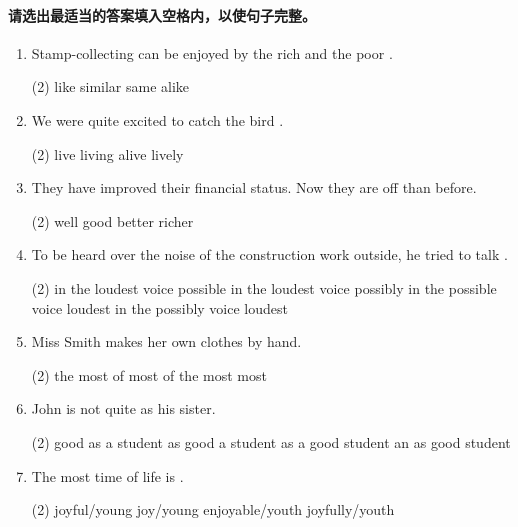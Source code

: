 \paragraph{请选出最适当的答案填入空格内，以使句子完整。}

\begin{enumerate}
\item Stamp-collecting can be enjoyed by the rich and the poor \ttu.
  \begin{tasks}(2)
    \task like
    \task similar
    \task same
    \task alike
  \end{tasks}

\item We were quite excited to catch the bird \ttu.
  \begin{tasks}(2)
    \task live
    \task living
    \task alive
    \task lively
  \end{tasks}

\item They have improved their financial status. Now they are \ttu off than before.
  \begin{tasks}(2)
    \task well
    \task good
    \task better
    \task richer
  \end{tasks}

\item To be heard over the noise of the construction work outside, he tried to talk \ttu.
  \begin{tasks}(2)
    \task in the loudest voice possible
    \task in the loudest voice possibly
    \task in the possible voice loudest
    \task in the possibly voice loudest
  \end{tasks}

\item Miss Smith makes \ttu her own clothes by hand.
  \begin{tasks}(2)
    \task the most of
    \task most of
    \task the most
    \task most
  \end{tasks}

\item John is not quite \ttu as his sister.
  \begin{tasks}(2)
    \task good as a student
    \task as good a student
    \task as a good student
    \task an as good student
  \end{tasks}

\item The most \ttu time of life is \ttu.
  \begin{tasks}(2)
    \task joyful/young
    \task joy/young
    \task enjoyable/youth
    \task joyfully/youth
  \end{tasks}


\end{enumerate}
